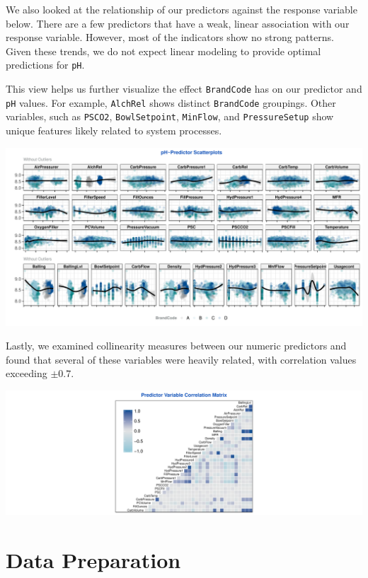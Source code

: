 \documentclass[]{report}
\begin{document}
We also looked at the relationship of our predictors against the
response variable below. There are a few predictors that have a weak,
linear association with our response variable. However, most of the
indicators show no strong patterns. Given these trends, we do not expect
linear modeling to provide optimal predictions for \texttt{pH}.

This view helps us further visualize the effect \texttt{BrandCode} has
on our predictor and \texttt{pH} values. For example, \texttt{AlchRel}
shows distinct \texttt{BrandCode} groupings. Other variables, such as
\texttt{PSCO2}, \texttt{BowlSetpoint}, \texttt{MinFlow}, and
\texttt{PressureSetup} show unique features likely related to system
processes.

\includegraphics{Proj2-JM_files/figure-latex/unnamed-chunk-5-1.pdf}

Lastly, we examined collinearity measures between our numeric predictors
and found that several of these variables were heavily related, with
correlation values exceeding \(\pm{0.7}\).

\includegraphics{Proj2-JM_files/figure-latex/unnamed-chunk-6-1.pdf}

\hypertarget{data-preparation}{%
\chapter{Data Preparation}\label{data-preparation}}
\end{document}
